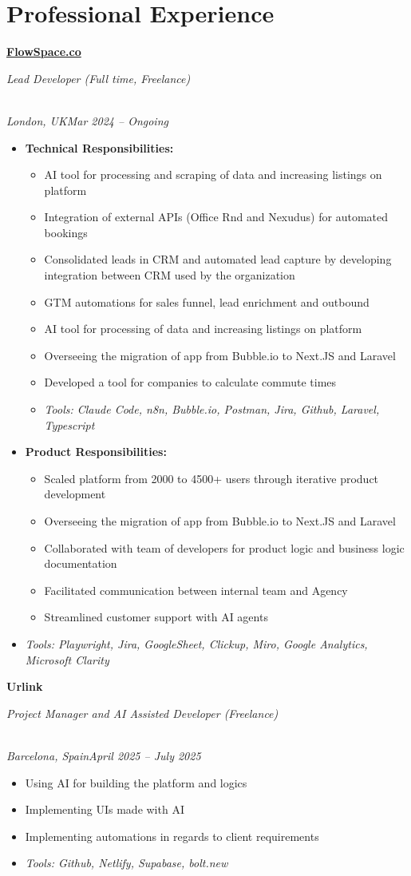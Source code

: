 \documentclass[a4paper,10pt]{article}
\newcommand{\role}[4]{\vspace{3pt}\noindent\hspace{0.6em}\parbox[t]{0.38\textwidth}{\raggedright\textbf{#1}}\hfill\parbox[t]{0.58\textwidth}{\raggedleft\textit{#2}}\\{\textit{#3}\hfill\textit{#4}}\vspace{1pt}}
\begin{document}
\section{Professional Experience}
\role{\href{https://flowspace.co}{FlowSpace.co}}{Lead Developer (Full time, Freelance)}{London, UK}{Mar 2024 -- Ongoing}
\begin{itemize}
\item \textbf{Technical Responsibilities:}
\begin{itemize}[label=--]
\item AI tool for processing and scraping of data and increasing listings on platform
\item Integration of external APIs (Office Rnd and Nexudus) for automated bookings
\item Consolidated leads in CRM and automated lead capture by developing integration between CRM used by the organization
\item GTM automations for sales funnel, lead enrichment and outbound
\item AI tool for processing of data and increasing listings on platform
\item Overseeing the migration of app from Bubble.io to Next.JS and Laravel
\item Developed a tool for companies to calculate commute times
\item \textit{Tools: Claude Code, n8n, Bubble.io, Postman, Jira, Github, Laravel, Typescript}
\end{itemize}
\item \textbf{Product Responsibilities:}
\begin{itemize}[label=--]
\item Scaled platform from 2000 to 4500+ users through iterative product development
\item Overseeing the migration of app from Bubble.io to Next.JS and Laravel
\item Collaborated with team of developers for product logic and business logic documentation
\item Facilitated communication between internal team and Agency
\item Streamlined customer support with AI agents
\end{itemize}
\item \textit{Tools: Playwright, Jira, GoogleSheet, Clickup, Miro, Google Analytics, Microsoft Clarity}
\end{itemize}

\role{Urlink}{Project Manager and AI Assisted Developer (Freelance)}{Barcelona, Spain}{April 2025 -- July 2025}
\begin{itemize}
\item Using AI for building the platform and logics
\item Implementing UIs made with AI
\item Implementing automations in regards to client requirements
\item \textit{Tools: Github, Netlify, Supabase, bolt.new}
\end{itemize}
\end{document}
